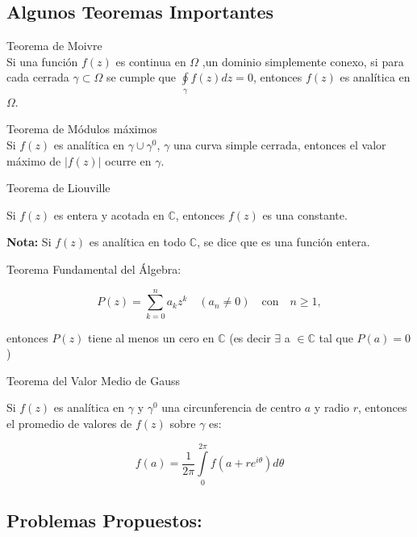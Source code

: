 \documentclass[a4paper,12pt]{article}
\begin{document}
\subsection{Algunos Teoremas Importantes}



\begin{theorem}{Teorema de Moivre}\\
Si una función $f(z)$ es continua en $\Omega$ ,un dominio simplemente conexo, si para cada cerrada $\gamma \subset \Omega$ se cumple que $\oint\limits_{\gamma} f(z)dz = 0$, entonces $f(z)$ es analítica en $\Omega$.
\end{theorem}

\begin{theorem}{Teorema de Módulos máximos}\\
Si $f(z)$ es analítica en $\gamma \cup \gamma^0$, $\gamma$ una curva simple cerrada, entonces el valor máximo de $|f(z)|$ ocurre en $\gamma$.
\end{theorem}

\begin{theorem}{Teorema de Liouville}

Si $f(z)$ es entera y acotada en $\mathbb{C}$, entonces $f(z)$ es una constante.

\textbf{Nota:} Si $f(z)$ es analítica en todo $\mathbb{C}$, se dice que es una función entera.
\end{theorem}

\begin{theorem}{Teorema Fundamental del Álgebra:}

\[
P(z) = \sum_{k=0}^{n} a_k z^k \quad (a_n \neq 0) \quad \text{con} \quad n \geq 1,
\]

entonces $P(z)$ tiene al menos un cero en $\mathbb{C}$ (es decir $\exists$ a $\in \mathbb{C}$ tal que $P(a) = 0$)
\end{theorem}

\begin{theorem}{Teorema del Valor Medio de Gauss}

Si $f(z)$ es analítica en $\gamma$ y $\gamma^0$ una circunferencia de centro $a$ y radio $r$, entonces el promedio de valores de $f(z)$ sobre $\gamma$ es:

\[
f(a) = \frac{1}{2\pi} \int\limits_{0}^{2\pi} f(a + re^{i\theta}) d\theta
\]
\end{theorem}

\subsection{Problemas Propuestos:}
\end{document}
